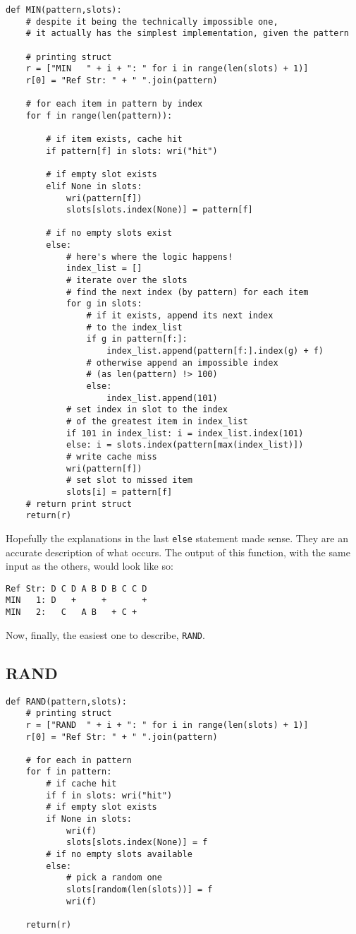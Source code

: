 \documentclass[11pt]{article}
\begin{document}
\begin{lstlisting}
def MIN(pattern,slots):
	# despite it being the technically impossible one,
	# it actually has the simplest implementation, given the pattern

	# printing struct
	r = ["MIN   " + i + ": " for i in range(len(slots) + 1)]
	r[0] = "Ref Str: " + " ".join(pattern)

	# for each item in pattern by index
	for f in range(len(pattern)):

		# if item exists, cache hit
		if pattern[f] in slots: wri("hit")

		# if empty slot exists
		elif None in slots:
			wri(pattern[f])
			slots[slots.index(None)] = pattern[f]

		# if no empty slots exist
		else:
			# here's where the logic happens!
			index_list = []
			# iterate over the slots
			# find the next index (by pattern) for each item
			for g in slots:
				# if it exists, append its next index
				# to the index_list
				if g in pattern[f:]:
					index_list.append(pattern[f:].index(g) + f)
				# otherwise append an impossible index
				# (as len(pattern) !> 100)
				else:
					index_list.append(101)
			# set index in slot to the index
			# of the greatest item in index_list
			if 101 in index_list: i = index_list.index(101)
			else: i = slots.index(pattern[max(index_list)])
			# write cache miss
			wri(pattern[f])
			# set slot to missed item
			slots[i] = pattern[f]
	# return print struct
	return(r)

\end{lstlisting}

Hopefully the explanations in the last \texttt{else} statement made sense.
They are an accurate description of what occurs.
The output of this function, with the same input as the others, would look like so:

\begin{lstlisting}
Ref Str: D C D A B D B C C D
MIN   1: D   +     +       +
MIN   2:   C   A B   + C +
\end{lstlisting}

Now, finally, the easiest one to describe, \texttt{RAND}.

\subsection{RAND}

\begin{lstlisting}
def RAND(pattern,slots):
	# printing struct
	r = ["RAND  " + i + ": " for i in range(len(slots) + 1)]
	r[0] = "Ref Str: " + " ".join(pattern)

	# for each in pattern
	for f in pattern:
		# if cache hit
		if f in slots: wri("hit")
		# if empty slot exists
		if None in slots:
			wri(f)
			slots[slots.index(None)] = f
		# if no empty slots available
		else:
			# pick a random one
			slots[random(len(slots))] = f
			wri(f)

	return(r)
\end{lstlisting}
\end{document}
